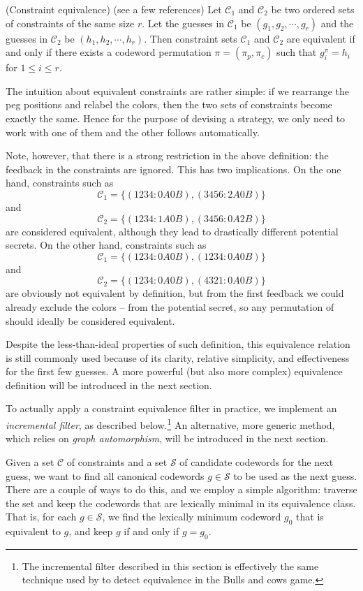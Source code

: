 \begin{definition}
(Constraint equivalence) (see a few references) Let $\mathcal{C}_1$ and $\mathcal{C}_2$ be two ordered sets of constraints of the same size $r$. Let the guesses in $\mathcal{C}_1$ be $(g_1,g_2,\cdots,g_r)$ and the guesses in $\mathcal{C}_2$ be $(h_1,h_2,\cdots,h_r)$. Then constraint sets $\mathcal{C}_1$ and $\mathcal{C}_2$ are equivalent if and only if there exists a codeword permutation $\pi=(\pi_p,\pi_c)$ such that
$g_i^\pi = h_i$ for $1 \le i \le r$.
\end{definition}

The intuition about equivalent constraints are rather simple: if we rearrange the peg positions and relabel the colors, then the two sets of constraints become exactly the same. Hence for the purpose of devising a strategy, we only need to work with one of them and the other follows automatically.

Note, however, that there is a strong restriction in the above definition: the feedback in the constraints are ignored. This has two implications. On the one hand, constraints such as 
\[
\mathcal{C}_1 = \{ (1234:0A0B), (3456:2A0B) \}
\]
and
\[
\mathcal{C}_2 = \{ (1234:1A0B), (3456:0A2B) \}
\]
are considered equivalent, although they lead to drastically different potential secrets. On the other hand, constraints such as
\[
\mathcal{C}_1 = \{ (1234:0A0B), (1234:0A0B) \}
\]
and
\[
\mathcal{C}_2 = \{ (1234:0A0B), (4321:0A0B) \}
\]
are obviously not equivalent by definition, but from the first feedback  we could already exclude the colors  --  from the potential secret, so any permutation of  should ideally be considered equivalent.

Despite the less-than-ideal properties of such definition, this equivalence relation is still commonly used \cite{neuwirth81,koyama93,francis10} because of its clarity, relative simplicity, and effectiveness for the first few guesses. A more powerful (but also more complex) equivalence definition will be introduced in the next section.

To actually apply a constraint equivalence filter in practice, we implement an \emph{incremental filter}, as described below.\footnote{The incremental filter described in this section is effectively the same technique used by \cite{francis10} to detect equivalence in the Bulls and cows game.}
An alternative, more generic method, which relies on \emph{graph automorphism}, will be introduced in the next section.

Given a set $\mathcal{C}$ of constraints and a set $\mathcal{S}$ of candidate codewords for the next guess, we want to find all canonical codewords $g \in \mathcal{S}$ to be used as the next guess. There are a couple of ways to do this, and we employ a simple algorithm: traverse the set and keep the codewords that are lexically minimal in its equivalence class. That is, for each $g \in \mathcal{S}$, we find the lexically minimum codeword $g_0$ that is equivalent to $g$, and keep $g$ if and only if $g = g_0$.

